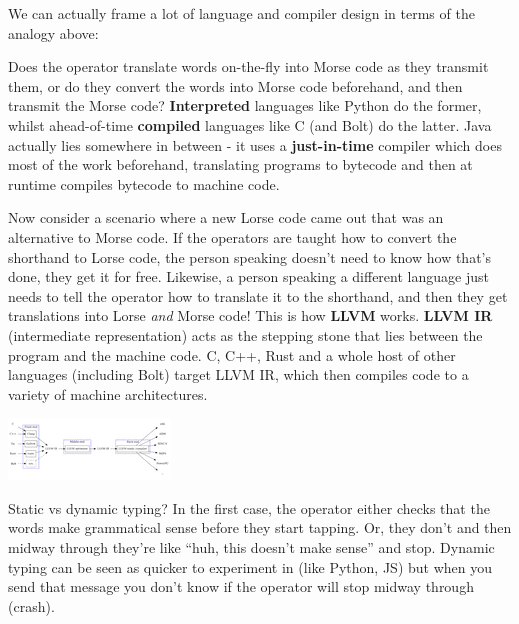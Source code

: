 We can actually frame a lot of language and compiler design in terms of
the analogy above:

Does the operator translate words on-the-fly into Morse code as they
transmit them, or do they convert the words into Morse code beforehand,
and then transmit the Morse code? \textbf{Interpreted} languages like
Python do the former, whilst ahead-of-time \textbf{compiled} languages
like C (and Bolt) do the latter. Java actually lies somewhere in between
- it uses a \textbf{just-in-time} compiler which does most of the work
beforehand, translating programs to bytecode and then at runtime
compiles bytecode to machine code.

Now consider a scenario where a new Lorse code came out that was an
alternative to Morse code. If the operators are taught how to convert
the shorthand to Lorse code, the person speaking doesn't need to know
how that's done, they get it for free. Likewise, a person speaking a
different language just needs to tell the operator how to translate it
to the shorthand, and then they get translations into Lorse \emph{and}
Morse code! This is how \textbf{LLVM} works. \textbf{LLVM IR}
(intermediate representation) acts as the stepping stone that lies
between the program and the machine code. C, C++, Rust and a whole host
of other languages (including Bolt) target LLVM IR, which then compiles
code to a variety of machine architectures.

{
\href{https://mukulrathi.com/static/cf22553f4c173ee4b0dec6bd67e38110/c658e/llvm.png}{{}
\includegraphics[width=\linewidth]{How I wrote my own proper programming language_files/llvm.png}}
}

Static vs dynamic typing? In the first case, the operator either checks
that the words make grammatical sense before they start tapping. Or,
they don't and then midway through they're like ``huh, this doesn't make
sense'' and stop. Dynamic typing can be seen as quicker to experiment in
(like Python, JS) but when you send that message you don't know if the
operator will stop midway through (crash).

